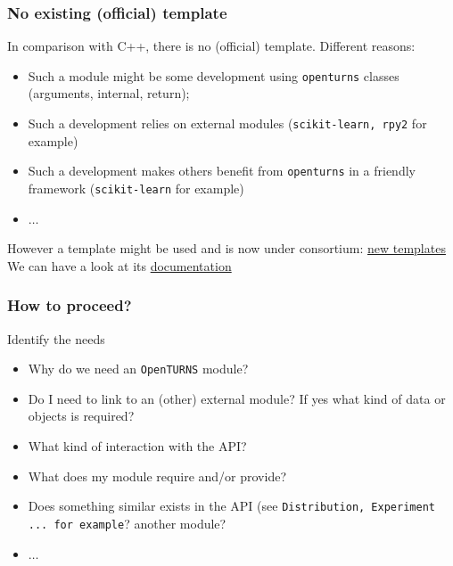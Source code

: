 \documentclass[8pt]{beamer}
\begin{document}
\begin{frame}
  \frametitle{No existing (official) template}
  \begin{block}{}
    In comparison with C++, there is no (official) template. Different reasons: 
    \begin{itemize}
    \item Such a module might be some development using \texttt{openturns} classes (arguments, internal, return);
    \item Such a development relies on external modules (\texttt{scikit-learn, rpy2} for example) 
    \item Such a development makes others benefit from \texttt{openturns} in a friendly framework (\texttt{scikit-learn} for example)
    \item $\hdots$
    \end{itemize}
    However a template might be used and is now under consortium: \href{https://github.com/openturns/ottemplatepython.git}{new templates}\\
    We can have a look at its \href{https://sofianehaddad.github.io/sphinx/ottemplate/master/}{documentation}
  \end{block}
\end{frame}

\begin{frame}
  \frametitle{How to proceed?}
  \begin{block}{Identify the needs}     
    \begin{itemize}
      \item Why do we need an \texttt{OpenTURNS} module? 
      \item Do I need to link to an (other) external module? If yes what kind of data or objects is required?
      \item What kind of interaction with the API?
      \item What does my module require and\slash or provide? 
      \item Does something similar exists in the API (see \texttt{Distribution, Experiment ... for example}? another module?
      \item $\hdots$ 
    \end{itemize}
  \end{block}
\end{frame}
\end{document}

